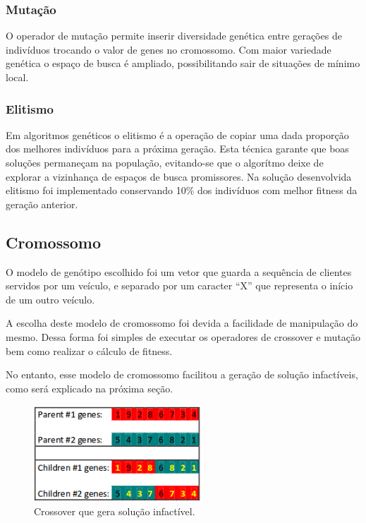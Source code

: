 \documentclass[conference]{IEEEtran}
\begin{document}
\subsubsection{Mutação}
O operador de mutação permite inserir diversidade genética entre gerações de indivíduos trocando o valor de genes no cromossomo. Com maior variedade genética o espaço de busca é ampliado, possibilitando sair de situações de mínimo local.

\subsubsection{Elitismo}
Em algoritmos genéticos o elitismo é a operação de copiar uma dada proporção dos melhores indivíduos para a próxima geração. Esta técnica garante que boas soluções permaneçam na população, evitando-se que o algorítmo deixe de explorar a vizinhança de espaços de busca promissores. Na solução desenvolvida elitismo foi implementado conservando 10\% dos indivíduos com melhor fitness da geração anterior.



\subsection{Cromossomo}
O modelo de genótipo escolhido foi um vetor que guarda a sequência de clientes servidos por um veículo, e separado por um caracter ``X'' que representa o início de um outro veículo.

A escolha deste modelo de cromossomo foi devida a facilidade de manipulação do mesmo. Dessa forma foi simples de executar os operadores de crossover e mutação bem como realizar o cálculo de fitness.

No entanto, esse modelo de cromossomo facilitou a geração de solução infactíveis, como será explicado na próxima seção.

\begin{figure}[!t]
\centering
\includegraphics[width=2.5in]{error_in_crossover}
\caption{Crossover que gera solução infactível.}
\label{fig_sim}
\end{figure}
\end{document}
